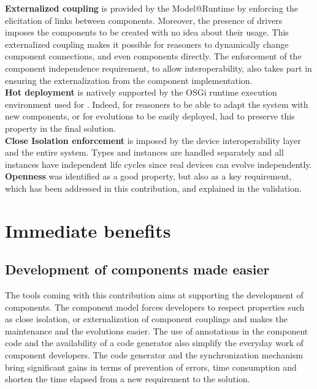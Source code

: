 {\bf Externalized coupling} is provided by the Model@Runtime by enforcing the elicitation of links between components. Moreover, the presence of drivers imposes the components to be created with no idea about their usage. This externalized coupling makes it possible for reasoners to dynamically change component connections, and even components directly. The enforcement of the component independence requirement, to allow interoperability, also takes part in ensuring the externalization from the component implementation.\\

{\bf Hot deployment} is natively supported by the OSGi runtime execution environment used for \enti{}. Indeed, for reasoners to be able to adapt the system with new components, or for evolutions to be easily deployed, \enti{} had to preserve this property in the final solution.\\

{\bf Close Isolation enforcement} is imposed by the device interoperability layer and the entire \enti{} system. Types and instances are handled separately and all instances have independent life cycles since real devices can evolve independently.\\

{\bf Openness} was identified as a good property, but also as a key requirement, which has been addressed in this contribution, and explained in the validation.


\section{Immediate benefits}

\subsection{Development of components made easier}
The tools coming with this contribution aims at supporting the development of components. The component model forces developers to respect properties such as close isolation, or externalization of component couplings and makes the maintenance and the evolutions easier. The use of annotations in the component code and the availability of a code generator also simplify the everyday work of component developers. The code generator and the synchronization mechanism bring significant gains in terms of prevention of errors, time consumption and shorten the time elapsed from a new requirement to the solution.


